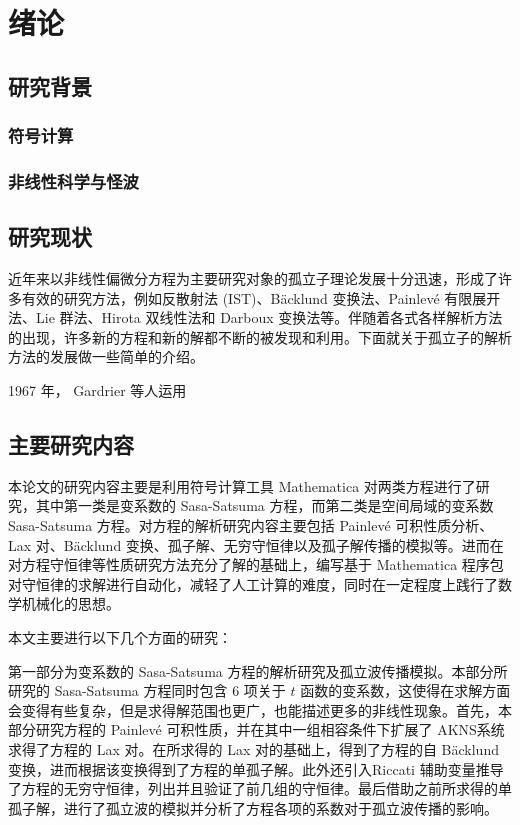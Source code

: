 \chapter{绪论}
\section{研究背景}
\subsection{符号计算}


\subsection{非线性科学与怪波}


\section{研究现状}
近年来以非线性偏微分方程为主要研究对象的孤立子理论发展十分迅速，形成了许多有效的研究方法，例如反散射法 (IST)、B\"{a}cklund 变换法、Painlev\'{e} 有限展开法、Lie 群法、Hirota 双线性法和 Darboux 变换法等。伴随着各式各样解析方法的出现，许多新的方程和新的解都不断的被发现和利用。下面就关于孤立子的解析方法的发展做一些简单的介绍。

1967 年， Gardrier 等人运用




\section{主要研究内容}

本论文的研究内容主要是利用符号计算工具 Mathematica 对两类方程进行了研究，其中第一类是变系数的 Sasa-Satsuma 方程，而第二类是空间局域的变系数 Sasa-Satsuma 方程。对方程的解析研究内容主要包括  Painlev\'{e} 可积性质分析、Lax 对、B\"{a}cklund 变换、孤子解、无穷守恒律以及孤子解传播的模拟等。进而在对方程守恒律等性质研究方法充分了解的基础上，编写基于 Mathematica 程序包对守恒律的求解进行自动化，减轻了人工计算的难度，同时在一定程度上践行了数学机械化的思想。

本文主要进行以下几个方面的研究：

第一部分为变系数的 Sasa-Satsuma 方程的解析研究及孤立波传播模拟。本部分所研究的  Sasa-Satsuma 方程同时包含 6 项关于 $t$ 函数的变系数，这使得在求解方面会变得有些复杂，但是求得解范围也更广，也能描述更多的非线性现象。首先，本部分研究方程的 Painlev\'{e} 可积性质，并在其中一组相容条件下扩展了 AKNS系统求得了方程的 Lax 对。在所求得的 Lax 对的基础上，得到了方程的自 B\"{a}cklund变换，进而根据该变换得到了方程的单孤子解。此外还引入Riccati 辅助变量推导了方程的无穷守恒律，列出并且验证了前几组的守恒律。最后借助之前所求得的单孤子解，进行了孤立波的模拟并分析了方程各项的系数对于孤立波传播的影响。

